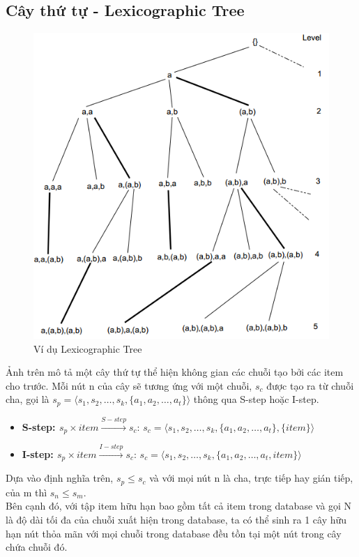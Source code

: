 \documentclass[a4paper 14pt]{article}
\begin{document}
		\subsection{Cây thứ tự - Lexicographic Tree}
			\begin{figure}[H]
				\includegraphics[scale = 0.9]{lextree}
				\caption{Ví dụ Lexicographic Tree}
			\end{figure}
			Ảnh trên mô tả một cây thứ tự thể hiện không gian các chuỗi tạo bởi các item cho trước. Mỗi nút n của cây sẽ tương ứng với một chuỗi, $s_c$  được tạo ra từ chuỗi cha, gọi là $s_p = \langle s_1, s_2, \hdots, s_k, \{a_1, a_2, \hdots, a_t\}\rangle$ thông qua S-step hoặc I-step.\\
			\begin{itemize}
				\item \textbf{S-step: $s_p \times item \overset{S-step}{\longrightarrow} s_c$}: $s_c = \langle s_1, s_2, \hdots, s_k, \{a_1, a_2, \hdots, a_t\}, \{item\}\rangle$ 
				\item \textbf{I-step: $s_p \times item \overset{I-step}{\longrightarrow} s_c$}: $s_c = \langle s_1, s_2, \hdots, s_k, \{a_1, a_2, \hdots, a_t, item\}\rangle$ 
			\end{itemize}
			Dựa vào định nghĩa trên, $s_p \leq s_c$ và với mọi nút n là cha, trực tiếp hay gián tiếp, của m thì $s_n \leq s_m$.\\
			Bên cạnh đó, với tập item hữu hạn bao gồm tất cả item trong database và gọi N là độ dài tối đa của chuỗi xuất hiện trong database, ta có thể sinh ra 1 cây hữu hạn nút thỏa mãn với mọi chuỗi trong database đều tồn tại một nút trong cây chứa chuỗi đó.
\end{document}
